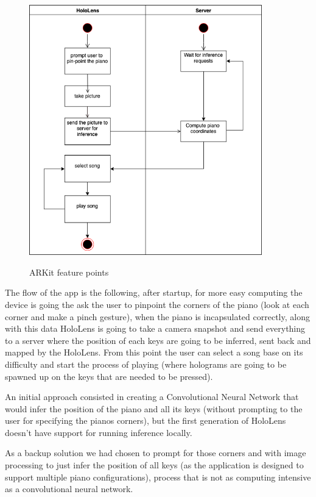 \documentclass[12 pct]{report}
\begin{document}
\begin{figure}[H]
\includegraphics[width=0.9\textwidth]{HoloPianoStateDiagram}
\centering
\label{fig:feature-points}
\caption{ARKit feature points}
\end{figure}

The flow of the app is the following, after startup, for more easy computing the device is going the ask the user to pinpoint the corners of the piano (look at each corner and make a pinch gesture), when the piano is incapsulated correctly, along with this data HoloLens is going to take a camera snapshot and send everything to a server where the position of each keys are going to be inferred, sent back and mapped by the HoloLens. From this point the user can select a song base on its difficulty and start the process of playing (where holograms are going to be spawned up on the keys that are needed to be pressed).

An initial approach consisted in creating a Convolutional Neural Network that would infer the position of the piano and all its keys (without prompting to the user for specifying the pianos corners), but the first generation of HoloLens doesn't have support for running inference locally.

As a backup solution we had chosen to prompt for those corners and with image processing to just infer the position of all keys (as the application is designed to support multiple piano configurations), process that is not as computing intensive as a convolutional neural network.
\end{document}
